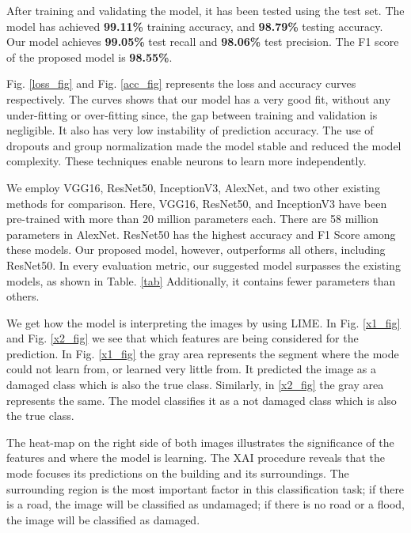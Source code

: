 \documentclass[conference]{IEEEtran}
\begin{document}
After training and validating the model, it has been tested using the test set. The model has achieved \textbf{99.11\%} training accuracy, and \textbf{98.79\%} testing accuracy. Our model achieves \textbf{99.05\%} test recall  and \textbf{98.06\%} test precision. The F1 score of the proposed model is \textbf{98.55\%}.

Fig. \ref{loss_fig} and Fig. \ref{acc_fig} represents the loss and accuracy curves respectively. The curves shows that our model has a very good fit, without any under-fitting or over-fitting since, the gap between training and validation is negligible. It also has very low instability of prediction accuracy. The use of dropouts and group normalization made the model stable and reduced the model complexity. These techniques enable neurons to learn more independently.

We employ VGG16, ResNet50, InceptionV3, AlexNet, and two other existing methods for comparison. Here, VGG16, ResNet50, and InceptionV3 have been pre-trained with more than 20 million parameters each. There are 58 million parameters in AlexNet. ResNet50 has the highest accuracy and F1 Score among these models. Our proposed model, however, outperforms all others, including ResNet50. In every evaluation metric, our suggested model surpasses the existing models, as shown in Table. \ref{tab} Additionally, it contains fewer parameters than others.

We get how the model is interpreting the images by using LIME. In Fig. \ref{x1_fig} and Fig. \ref{x2_fig} we see that which features are being considered for the prediction. In Fig. \ref{x1_fig} the gray area represents the segment where the mode could not learn from, or learned very little from. It predicted the image as a damaged class which is also the true class. Similarly, in \ref{x2_fig} the gray area represents the same. The model classifies it as a not damaged class which is also the true class.

The heat-map on the right side of both images illustrates the significance of the features and where the model is learning. The XAI procedure reveals that the mode focuses its predictions on the building and its surroundings. The surrounding region is the most important factor in this classification task; if there is a road, the image will be classified as undamaged; if there is no road or a flood, the image will be classified as damaged.
\end{document}
